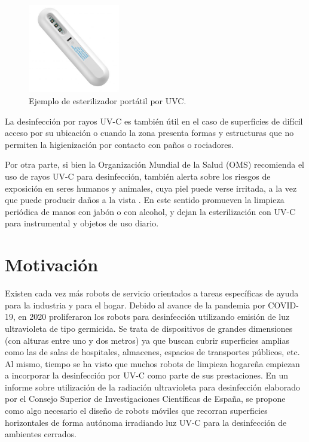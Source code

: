 \begin{figure}[h]
	\centering
	\includegraphics[width=4cm]{./Figures/esterilizador.PNG}
	\caption{Ejemplo de esterilizador portátil por UVC\protect\footnotemark.}
	\label{fig:esterilizador}
\end{figure}


La desinfección por rayos UV-C es también útil en el caso de superficies de difícil acceso por su ubicación o cuando la zona presenta formas y estructuras que no permiten la higienización por contacto con paños o rociadores. 
 
Por otra parte, si bien la Organización Mundial de la Salud (OMS) recomienda el uso de rayos UV-C para desinfección, también alerta sobre los riesgos de  exposición en seres humanos y animales, cuya piel puede verse irritada, a la vez que puede producir daños a la vista \citep{MYTH}. En este sentido promueven la limpieza periódica de manos con jabón o con alcohol, y dejan la esterilización con UV-C para  instrumental y objetos de uso diario.




\section{Motivación}

Existen cada vez más robots de servicio orientados a tareas específicas de ayuda para la industria y para el hogar. 
Debido al avance de la pandemia por COVID-19, en 2020 proliferaron los robots  para desinfección utilizando emisión de luz ultravioleta de tipo germicida. Se trata de dispositivos de grandes dimensiones (con alturas entre uno y dos metros) ya que buscan cubrir superficies amplias como las de salas de hospitales, almacenes, espacios de transportes públicos, etc. Al mismo, tiempo se ha visto que muchos robots de limpieza hogareña empiezan a incorporar la desinfección por UV-C como parte de sus prestaciones. 
En un informe sobre utilización de la radiación ultravioleta para desinfección \citep{CSIC} elaborado por el Consejo Superior de Investigaciones Científicas de España, se propone como algo necesario el diseño de robots móviles que recorran superficies horizontales de forma autónoma irradiando luz UV-C para la desinfección de ambientes cerrados.

